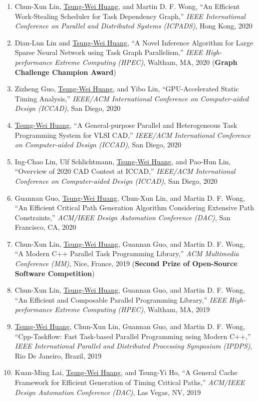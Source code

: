 \documentclass[A4,11pt]{article}
\begin{document}
\begin{enumerate}
    \item Chun-Xun Lin, \underline{Tsung-Wei Huang}, and Martin D. F. Wong, ``An Efficient Work-Stealing Scheduler for Task Dependency Graph,'' \textit{IEEE International Conference on Parallel and Distributed Systems (ICPADS)}, Hong Kong, 2020
    \item Dian-Lun Lin and \underline{Tsung-Wei Huang}, ``A Novel Inference Algorithm for Large Sparse Neural Network using Task Graph Parallelism,'' \textit{IEEE High-performance Extreme Computing (HPEC)}, Waltham, MA, 2020 (\textbf{Graph Challenge Champion Award})
    \item Zizheng Guo, \underline{Tsung-Wei Huang}, and Yibo Lin, ``GPU-Accelerated Static Timing Analysis,'' \textit{IEEE/ACM International Conference on Computer-aided Design (ICCAD)}, San Diego, 2020 
    \item \underline{Tsung-Wei Huang}, ``A General-purpose Parallel and Heterogeneous Task Programming System for VLSI CAD,'' \textit{IEEE/ACM International Conference on Computer-aided Design (ICCAD)}, San Diego, 2020
    \item Ing-Chao Lin, Ulf Schlichtmann, \underline{Tsung-Wei Huang}, and Pao-Hun Lin, ``Overview of 2020 CAD Contest at ICCAD,'' \textit{IEEE/ACM International Conference on Computer-aided Design (ICCAD)}, San Diego, 2020
    \item Guannan Guo, \underline{Tsung-Wei Huang}, Chun-Xun Lin, and Martin D. F. Wong, ``An Efficient Critical Path Generation Algorithm Considering Extensive Path Constraints,'' \textit{ACM/IEEE Design Automation Conference (DAC)}, San Francisco, CA, 2020
    \item Chun-Xun Lin, \underline{Tsung-Wei Huang}, Guannan Guo, and Martin D. F. Wong, ``A Modern C++ Parallel Task Programming Library,'' \textit{ACM Multimedia Conference (MM)}, Nice, France, 2019 (\textbf{Second Prize of Open-Source Software Competition})
    \item Chun-Xun Lin, \underline{Tsung-Wei Huang}, Guannan Guo, and Martin D. F. Wong, ``An Efficient and Composable Parallel Programming Library,'' \textit{IEEE High-performance Extreme Computing (HPEC)}, Waltham, MA, 2019
    \item \underline{Tsung-Wei Huang}, Chun-Xun Lin, Guannan Guo, and Martin D. F. Wong, ``Cpp-Taskflow: Fast Task-based Parallel Programming using Modern C++,'' \textit{IEEE International Parallel and Distributed Processing Symposium (IPDPS)}, Rio De Janeiro, Brazil, 2019
    \item Kuan-Ming Lai, \underline{Tsung-Wei Huang}, and Tsung-Yi Ho, ``A General Cache Framework for Efficient Generation of Timing Critical Paths,'' \textit{ACM/IEEE Design Automation Conference (DAC)}, Las Vegas, NV, 2019

\end{enumerate}
\end{document}
